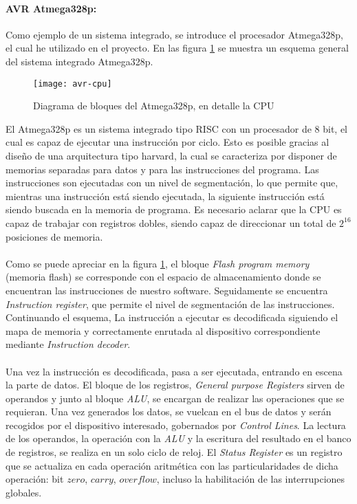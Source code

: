 \paragraph{AVR Atmega328p:} Como ejemplo de un sistema integrado, se introduce el procesador Atmega328p, el cual he utilizado en el proyecto. 
En las figura \ref{fig:avr-cpu} se muestra un esquema general del sistema integrado Atmega328p. 
\begin{figure}[h]
    \centering
    \texttt{[image: avr-cpu]}
    \caption{Diagrama de bloques del Atmega328p, en detalle la CPU}
    \label{fig:avr-cpu}
\end{figure}
El Atmega328p es un sistema integrado tipo RISC con un procesador de 8 bit, el cual es capaz de ejecutar una instrucci\'on por ciclo. Esto es posible gracias al diseño de una arquitectura tipo harvard, la cual se caracteriza por disponer de memorias separadas para datos y para las instrucciones del programa. Las instrucciones son ejecutadas con un nivel de segmentaci\'on, lo que permite que, mientras una instrucción está siendo ejecutada, la siguiente instrucción está siendo buscada en la memoria de programa. Es necesario aclarar que la CPU es capaz de trabajar con registros dobles, siendo capaz de direccionar un total de $2^{16}$ posiciones de memoria.
\paragraph{}
Como se puede apreciar en la figura \ref{fig:avr-cpu}, el bloque \textit{Flash program memory} (memoria flash) se corresponde con el espacio de almacenamiento donde se encuentran las instrucciones de nuestro software. Seguidamente se encuentra \textit{Instruction register}, que permite el nivel de segmentaci\'on de las instrucciones. Continuando el esquema, La instrucci\'on a ejecutar es decodificada siguiendo el mapa de memoria y correctamente enrutada al dispositivo correspondiente mediante \textit{Instruction decoder}.
\paragraph{}
Una vez la instrucci\'on es decodificada, pasa a ser ejecutada, entrando en escena la parte de datos. El bloque de los registros, \textit{General purpose Registers} sirven de operandos y junto al bloque \textit{ALU}, se encargan de realizar las operaciones que se requieran. Una vez generados los datos, se vuelcan en el bus de datos y ser\'an recogidos por el dispositivo interesado, gobernados por \textit{Control Lines}. La lectura de los operandos, la operaci\'on con la \textit{ALU} y la escritura del resultado en el banco de registros, se realiza en un solo ciclo de reloj. El \textit{Status Register} es un registro que se actualiza en cada operaci\'on aritm\'etica con las particularidades de dicha operaci\'on: bit $zero$, $carry$, $overflow$, incluso la habilitaci\'on de las interrupciones globales.
